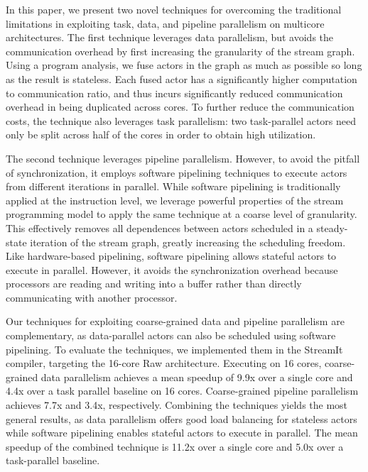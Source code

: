 In this paper, we present two novel techniques for overcoming the
traditional limitations in exploiting task, data, and pipeline
parallelism on multicore architectures.  The first technique leverages
data parallelism, but avoids the communication overhead by first
increasing the granularity of the stream graph.  Using a program
analysis, we fuse actors in the graph as much as possible so long as
the result is stateless.  Each fused actor has a significantly higher
computation to communication ratio, and thus incurs significantly
reduced communication overhead in being duplicated across cores.  To
further reduce the communication costs, the technique also leverages
task parallelism: two task-parallel actors need only be split across
half of the cores in order to obtain high utilization.

The second technique leverages pipeline parallelism.  However, to
avoid the pitfall of synchronization, it employs software pipelining
techniques to execute actors from different iterations in parallel.
While software pipelining is traditionally applied at the instruction
level, we leverage powerful properties of the stream programming model
to apply the same technique at a coarse level of granularity.  This
effectively removes all dependences between actors scheduled in a
steady-state iteration of the stream graph, greatly increasing the
scheduling freedom.  Like hardware-based pipelining, software
pipelining allows stateful actors to execute in parallel.
However, it avoids the synchronization overhead because processors are
reading and writing into a buffer rather than directly communicating
with another processor.

Our techniques for exploiting coarse-grained data and pipeline
parallelism are complementary, as data-parallel actors can also be
scheduled using software pipelining.  To evaluate the techniques, we
implemented them in the StreamIt compiler, targeting the 16-core Raw
architecture.  Executing on 16 cores, coarse-grained data parallelism
achieves a mean speedup of 9.9x over a single core and 4.4x over a
task parallel baseline on 16 cores.  Coarse-grained pipeline
parallelism achieves 7.7x and 3.4x, respectively.  Combining the
techniques yields the most general results, as data parallelism offers
good load balancing for stateless actors while software pipelining
enables stateful actors to execute in parallel.  The mean speedup of
the combined technique is 11.2x over a single core and 5.0x over a
task-parallel baseline.

